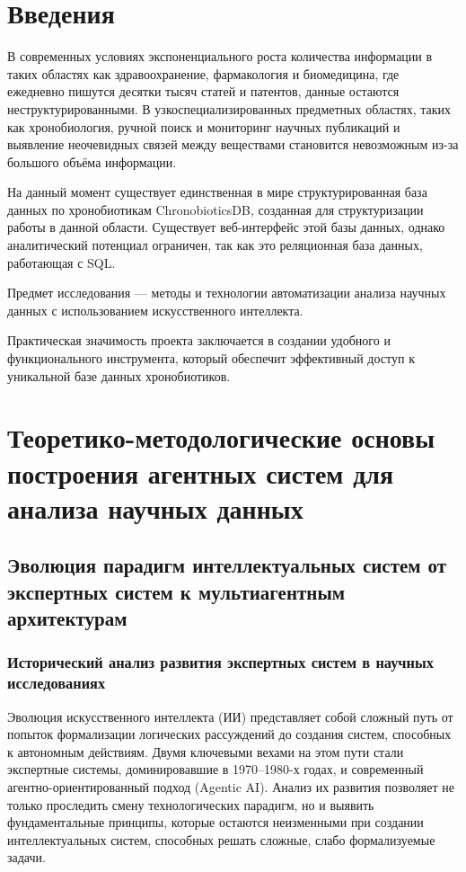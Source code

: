 
\section*{Введения}

В современных условиях экспоненциального роста количества информации в таких областях как здравоохранение, фармакология и биомедицина, где ежедневно пишутся десятки тысяч статей и патентов, данные остаются неструктурированными. В узкоспециализированных предметных областях, таких как хронобиология, ручной поиск и мониторинг научных публикаций и выявление неочевидных связей между веществами становится невозможным из-за большого объёма информации.

На данный момент существует единственная в мире структурированная база данных по хронобиотикам ChronobioticsDB, созданная для структуризации работы в данной области. Существует веб-интерфейс этой базы данных, однако аналитический потенциал ограничен, так как это реляционная база данных, работающая с SQL.

Предмет исследования --- методы и технологии автоматизации анализа научных данных с использованием искусственного интеллекта.

Практическая значимость проекта заключается в создании удобного и функционального инструмента, который обеспечит эффективный доступ к уникальной базе данных хронобиотиков.

\newpage

\section{Теоретико-методологические основы построения агентных систем для анализа научных данных}

\subsection{Эволюция парадигм интеллектуальных систем от экспертных систем к мультиагентным архитектурам}

\subsubsection{Исторический анализ развития экспертных систем в научных исследованиях}

Эволюция искусственного интеллекта (ИИ) представляет собой сложный путь от попыток формализации логических рассуждений до создания систем, способных к автономным действиям. Двумя ключевыми вехами на этом пути стали экспертные системы, доминировавшие в 1970–1980-х годах, и современный агентно-ориентированный подход (Agentic AI). Анализ их развития позволяет не только проследить смену технологических парадигм, но и выявить фундаментальные принципы, которые остаются неизменными при создании интеллектуальных систем, способных решать сложные, слабо формализуемые задачи.

